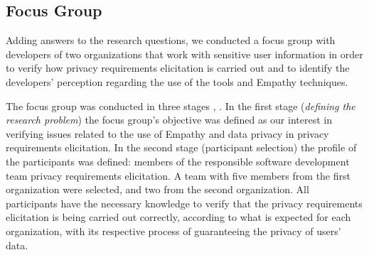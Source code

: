 \documentclass[conference]{IEEEtran}
\begin{document}
\subsection{Focus Group}


Adding answers to the research questions, we conducted a focus group with developers of two organizations that work with sensitive user information in order to verify how privacy requirements elicitation is carried out and to identify the developers' perception regarding the use of the tools and Empathy techniques.


The focus group was conducted in three stages \cite{DBLP:conf/isese/KontioLB04}, \cite{DBLP:conf/se/BrauerPSK20}. In the first stage (\emph{defining the research problem}) the focus group's objective was defined as our interest in verifying issues related to the use of Empathy and data privacy in privacy requirements elicitation. In the second stage (participant selection) the profile of the participants was defined: members of the responsible software development team privacy requirements elicitation. A team with five members from the first organization were selected, and two from the second organization. All participants have the necessary knowledge to verify that the privacy requirements elicitation is being carried out correctly, according to what is expected for each organization, with its respective process of guaranteeing the privacy of users' data.
\end{document}
